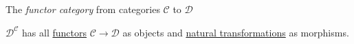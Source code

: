 The \emph{functor category} from categories $\mathcal{C}$ to $\mathcal{D}$

$\mathcal{D}^\mathcal{C}$ has all \hyperref[D3.35]{functors} $\mathcal{C} \rightarrow \mathcal{D}$ as objects and \hyperref[D3.49]{natural transformations} as morphisms.
